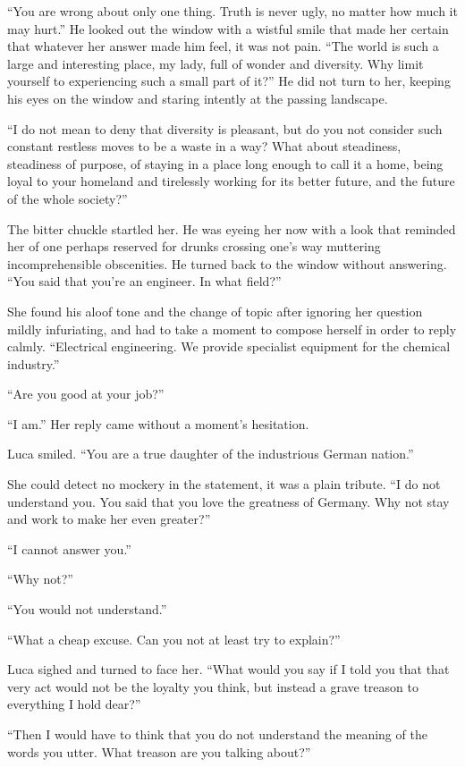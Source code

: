 ``You are wrong about only one thing. Truth is never ugly, no matter how much it may hurt.'' He looked out the window with a wistful smile that made her certain that whatever her answer made him feel, it was not pain. ``The world is such a large and interesting place, my lady, full of wonder and diversity. Why limit yourself to experiencing such a small part of it?'' He did not turn to her, keeping his eyes on the window and staring intently at the passing landscape.

``I do not mean to deny that diversity is pleasant, but do you not consider such constant restless moves to be a waste in a way? What about steadiness, steadiness of purpose, of staying in a place long enough to call it a home, being loyal to your homeland and tirelessly working for its better future, and the future of the whole society?''

The bitter chuckle startled her. He was eyeing her now with a look that reminded her of one perhaps reserved for drunks crossing one's way muttering incomprehensible obscenities. He turned back to the window without answering. ``You said that you're an engineer. In what field?''

She found his aloof tone and the change of topic after ignoring her question mildly infuriating, and had to take a moment to compose herself in order to reply calmly. ``Electrical engineering. We provide specialist equipment for the chemical industry.''

``Are you good at your job?''

``I am.'' Her reply came without a moment's hesitation.

Luca smiled. ``You are a true daughter of the industrious German nation.''

She could detect no mockery in the statement, it was a plain tribute. ``I do not understand you. You said that you love the greatness of Germany. Why not stay and work to make her even greater?''

``I cannot answer you.''

``Why not?''

``You would not understand.''

``What a cheap excuse. Can you not at least try to explain?''

Luca sighed and turned to face her. ``What would you say if I told you that that very act would not be the loyalty you think, but instead a grave treason to everything I hold dear?''

``Then I would have to think that you do not understand the meaning of the words you utter. What treason are you talking about?''

